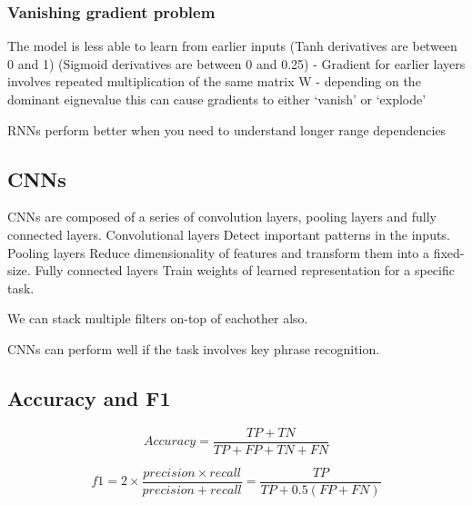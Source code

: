 \documentclass[11pt]{article}
\begin{document}
\subsubsection{Vanishing gradient problem}

The model is less able to learn from earlier inputs (Tanh derivatives are between 0 and 1) (Sigmoid derivatives are between 0 and 0.25) - Gradient for earlier layers involves repeated multiplication
of the same matrix W - depending on the dominant eignevalue this can cause gradients to either `vanish' or `explode'

\begin{warning}
    RNNs perform better when you need to understand longer range dependencies
\end{warning}

\subsection{CNNs}

CNNs are composed of a series of convolution layers,
pooling layers and fully connected layers. Convolutional layers Detect important patterns in the inputs. Pooling layers Reduce dimensionality of features and transform them into a fixed-size. Fully connected layers Train weights of learned representation for a specific task.

We can stack multiple filters on-top of eachother also.

\begin{warning}
    CNNs can perform well if the task involves key phrase recognition.
\end{warning}

\subsection{Accuracy and F1}

\begin{definition}[accuracy]
    \begin{equation*}
        Accuracy = \frac{TP + TN}{TP +FP + TN + FN}
    \end{equation*}
\end{definition}

\begin{definition}[f1-measure]
    \begin{equation*}
        f1 = 2 \times \frac{precision\times recall}{precision + recall} = \frac{TP}{TP + 0.5 (FP +FN)}
    \end{equation*}
\end{definition}
\end{document}
